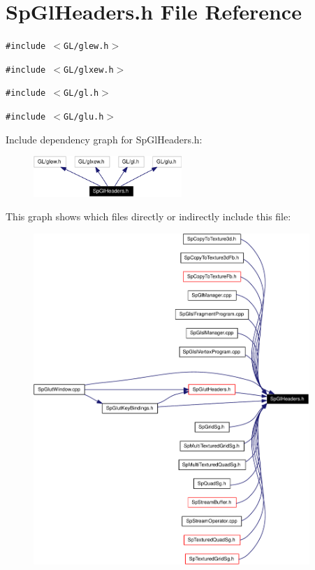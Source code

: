 \section{Sp\-Gl\-Headers.h File Reference}
\label{SpGlHeaders_8h}
{\tt \#include $<$GL/glew.h$>$}\par
{\tt \#include $<$GL/glxew.h$>$}\par
{\tt \#include $<$GL/gl.h$>$}\par
{\tt \#include $<$GL/glu.h$>$}\par


Include dependency graph for Sp\-Gl\-Headers.h:\begin{figure}[H]
\begin{center}
\leavevmode
\includegraphics[width=159pt]{SpGlHeaders_8h__incl}
\end{center}
\end{figure}


This graph shows which files directly or indirectly include this file:\begin{figure}[H]
\begin{center}
\leavevmode
\includegraphics[width=296pt]{SpGlHeaders_8h__dep__incl}
\end{center}
\end{figure}
